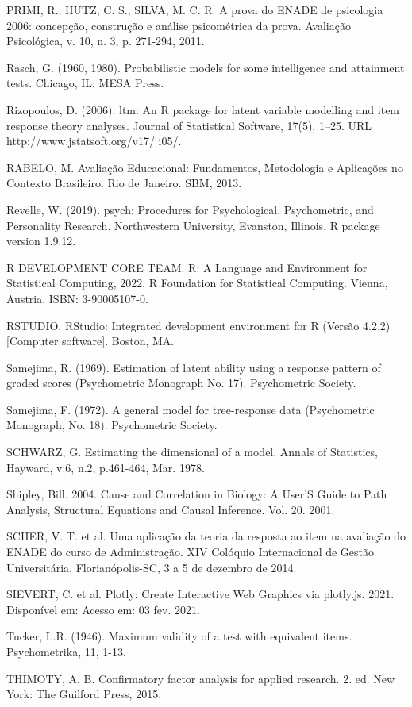 \documentclass[12pt]{article}
\begin{document}
PRIMI, R.; HUTZ, C. S.; SILVA, M. C. R. A prova do ENADE de psicologia 2006: concepção, construção e análise psicométrica da prova. Avaliação Psicológica, v. 10, n. 3, p. 271-294, 2011.

Rasch, G. (1960, 1980). Probabilistic models for some intelligence and attainment tests. Chicago, IL: MESA Press.

Rizopoulos, D. (2006). ltm: An R package for latent variable modelling and item response theory analyses. Journal of Statistical Software, 17(5), 1–25. URL http://www.jstatsoft.org/v17/ i05/.

RABELO, M. Avaliação Educacional: Fundamentos, Metodologia e Aplicações no Contexto Brasileiro. Rio de Janeiro. SBM, 2013.

Revelle, W. (2019). psych: Procedures for Psychological, Psychometric, and Personality Research. Northwestern University, Evanston, Illinois. R package version 1.9.12.

R DEVELOPMENT CORE TEAM. R: A Language and Environment for Statistical Computing, 2022. R Foundation for Statistical Computing. Vienna, Austria. ISBN: 3-90005107-0. 

RSTUDIO. RStudio: Integrated development environment for R (Versão 4.2.2) [Computer software]. Boston, MA. 

Samejima, R. (1969). Estimation of latent ability using a response pattern of graded scores (Psychometric Monograph No. 17). Psychometric Society. 

Samejima, F. (1972). A general model for tree-response data (Psychometric Monograph, No. 18). Psychometric Society. 

SCHWARZ, G. Estimating the dimensional of a model. Annals of Statistics, Hayward, v.6, n.2,
p.461-464, Mar. 1978.

Shipley, Bill. 2004. Cause and Correlation in Biology: A User’S Guide to Path Analysis, Structural Equations and Causal Inference. Vol. 20. 2001.

SCHER, V. T. et al. Uma aplicação da teoria da resposta ao item na avaliação do ENADE do curso de Administração. XIV Colóquio Internacional de Gestão Universitária, Florianópolis-SC, 3 a 5 de dezembro de 2014.

SIEVERT, C. et al. Plotly: Create Interactive Web Graphics via plotly.js. 2021. Disponível em: Acesso em: 03 fev. 2021.

Tucker, L.R. (1946). Maximum validity of a test with equivalent items. Psychometrika, 11, 1-13. 

THIMOTY, A. B. Confirmatory factor analysis for applied research. 2. ed. New York: The Guilford Press, 2015.
\end{document}
